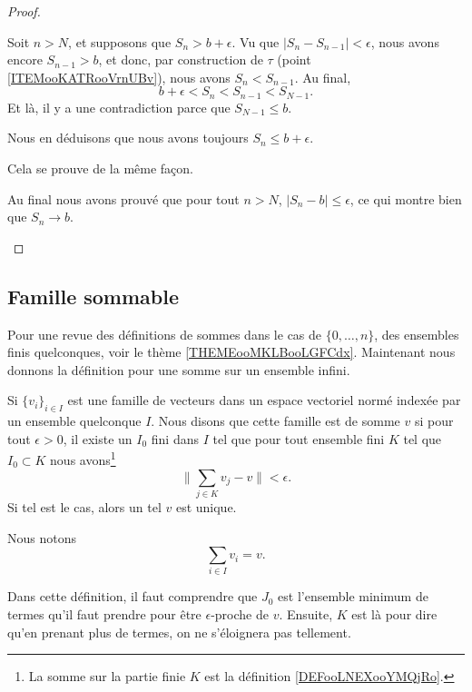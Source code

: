\begin{proof}
\begin{subproof}
\begin{subproof}
			Soit \( n>N\), et supposons que \( S_n>b+\epsilon\). Vu que \( | S_n-S_{n-1} |<\epsilon\), nous avons encore \( S_{n-1}>b\), et donc, par construction de \( \tau\) (point \ref{ITEMooKATRooVrnUBv}), nous avons \( S_n<S_{n-1}\). Au final,
			\begin{equation}
				b+\epsilon<S_n<S_{n-1}<S_{N-1}.
			\end{equation}
			Et là, il y a une contradiction parce que \( S_{N-1}\leq b\).

			Nous en déduisons que nous avons toujours \( S_n\leq b+\epsilon\).


			Cela se prouve de la même façon.

		\end{subproof}
		Au final nous avons prouvé que pour tout \( n>N\), \( | S_n-b |\leq \epsilon\), ce qui montre bien que \( S_n\to b\).
	\end{subproof}
\end{proof}


\subsection{Famille sommable}

Pour une revue des définitions de sommes dans le cas de \( \{ 0,\ldots, n \}\), des ensembles finis quelconques, voir le thème \ref{THEMEooMKLBooLGFCdx}. Maintenant nous donnons la définition pour une somme sur un ensemble infini.
\begin{propositionDef}  \label{DefIkoheE}
	Si \( \{ v_i \}_{i\in I}\) est une famille de vecteurs dans un espace vectoriel normé indexée par un ensemble quelconque \( I\). Nous disons que cette famille est  de somme \( v\) si pour tout \( \epsilon>0\), il existe un \( I_0\) fini dans \( I\) tel que pour tout ensemble fini \( K\) tel que \( I_0\subset K\) nous avons\footnote{La somme sur la partie finie \( K\) est la définition \ref{DEFooLNEXooYMQjRo}.}
	\begin{equation}
		\| \sum_{j\in K}v_j-v \|<\epsilon.
	\end{equation}
	Si tel est le cas, alors un tel \( v\) est unique.

	Nous notons
	\begin{equation}
		\sum_{i\in I}v_i=v.
	\end{equation}
\end{propositionDef}
Dans cette définition, il faut comprendre que \( J_0\) est l'ensemble minimum de termes qu'il faut prendre pour être \( \epsilon\)-proche de \( v\). Ensuite, \( K\) est là pour dire qu'en prenant plus de termes, on ne s'éloignera pas tellement.


